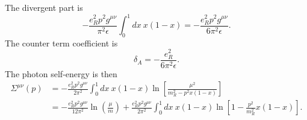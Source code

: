 The divergent part is
\begin{equation*}
	-\frac{e_R^2 p^2 g^{\mu\nu}}{\pi^2 \epsilon} \int_0^1 dx\ x(1-x)
	= -\frac{e_R^2 p^2 g^{\mu\nu}}{6\pi^2 \epsilon}.
\end{equation*}
The counter term coefficient is
\begin{equation}
	\delta_A = -\frac{e_R^2}{6\pi^2 \epsilon}.
\end{equation}
The photon self-energy is then
\begin{equation}
\begin{aligned}
	\Sigma^{\mu\nu}(p) 
	&= -\frac{e_R^2 p^2 g^{\mu\nu}}{2\pi^2} \int_0^1 dx\ x(1-x)
	\ln\left[\frac{\mu^2}{m_R^2-p^2 x(1-x)}\right] \\
	&= -\frac{e_R^2 p^2 g^{\mu\nu}}{12\pi^2} \ln\left(\frac{\mu}{m}\right)
	 + \frac{e_R^2 p^2 g^{\mu\nu}}{2\pi^2}\int_0^{1} dx\ x(1-x) \ln\left[1-\frac{p^2}{m_R^2}x(1-x)\right].
\end{aligned}
\end{equation}






